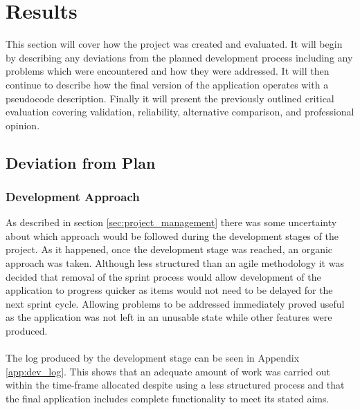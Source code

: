 \section{Results}\label{sec:results}
	This section will cover how the project was created and evaluated. It will begin by describing any deviations from the planned development process including any problems which were encountered and how they were addressed. It will then continue to describe how the final version of the application operates with a pseudocode description. Finally it will present the previously outlined critical evaluation covering validation, reliability, alternative comparison, and professional opinion.
	\subsection{Deviation from Plan}
		\subsubsection{Development Approach}
			As described in section \ref{sec:project_management} there was some uncertainty about which approach would be followed during the development stages of the project. As it happened, once the development stage was reached, an organic approach was taken. Although less structured than an agile methodology it was decided that removal of the sprint process would allow development of the application to progress quicker as items would not need to be delayed for the next sprint cycle. Allowing problems to be addressed immediately proved useful as the application was not left in an unusable state while other features were produced.
			\\\\
			The log produced by the development stage can be seen in Appendix \ref{app:dev_log}. This shows that an adequate amount of work was carried out within the time-frame allocated despite using a less structured process and that the final application includes complete functionality to meet its stated aims.
